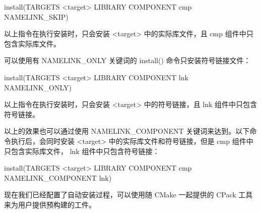 \begin{shell}
install(TARGETS <target> LIBRARY
        COMPONENT cmp NAMELINK_SKIP)
\end{shell}

以上指令在执行安装时，只会安装 <target> 中的实际库文件，且 cmp 组件中只包含实际库文件。

可以使用有 NAMELINK\_ONLY 关键词的 install() 命令只安装符号链接文件：

\begin{shell}
install(TARGETS <target> LIBRARY
        COMPONENT lnk NAMELINK_ONLY)
\end{shell}

以上指令在执行安装时，只会安装 <target> 中的符号链接，且 lnk 组件中只包含符号链接。

以上的效果也可以通过使用 NAMELINK\_COMPONENT 关键词来达到。以下命令执行后，会同时安装 <target> 中的实际库文件和符号链接，但是 cmp 组件中只包含实际库文件， lnk 组件中只包含符号链接：

\begin{shell}
install(TARGETS <target> LIBRARY
        COMPONENT cmp NAMELINK_COMPONENT lnk)
\end{shell}

现在我们已经配置了自动安装过程，可以使用随 CMake 一起提供的 CPack 工具来为用户提供预构建的工件。









































